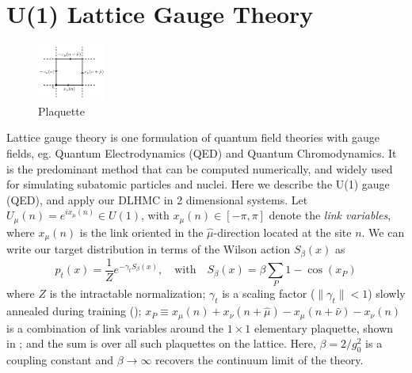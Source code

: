 \documentclass{article} %
\begin{document}
\section{\label{sec:lattice_gauge_theory}U(1) Lattice Gauge Theory}
%
\begin{figure}
      \centering
      \includegraphics[width=0.2\textwidth]{figures/plaq_tikz.pdf}
      \caption{\label{fig:plaquette}Plaquette}%
\end{figure}
Lattice gauge theory is one formulation of quantum field theories with gauge fields, eg. Quantum Electrodynamics (QED) and Quantum Chromodynamics.
It is the predominant method that can be computed numerically, and widely used for simulating subatomic particles and nuclei.
Here we describe the U(1) gauge (QED), and apply our DLHMC in 2 dimensional systems.
Let \(U_{\mu}(n) = e^{i x_{\mu}(n)} \in U(1)\), with \(x_{\mu}(n) \in [-\pi,\pi]\) denote the \emph{link
variables}, where \(x_{\mu}(n)\) is the link oriented in the \(\hat{\mu}\)-direction located at the site
\(n\).
%
We can write our target distribution in terms of the Wilson action \(S_{\beta}(x)\) as
%
\begin{equation}
   p_{t}(x) = \frac{1}{Z}e^{-\gamma_{t} S_{\beta}(x)},\quad\text{with}\quad S_{\beta}(x) = \beta \sum_{P}1 - \cos(x_{P})
   \label{eq:wilsonaction}
\end{equation}
%
where $Z$ is the intractable normalization;
\(\gamma_{t}\) is a scaling factor (\(\|\gamma_{t}\|<1\)) slowly annealed during training ();
\(x_{P} \equiv x_{\mu}(n) + x_{\nu}(n+\hat{\mu}) - x_{\mu}(n+\hat{\nu}) -x_{\nu}(n)\) is a combination of link
variables around the \(1\times1\) elementary plaquette, shown in ; and the sum is over all
such plaquettes on the lattice.
%
Here, \(\beta = 2 / g_{0}^{2}\) is a coupling constant and \(\beta\rightarrow\infty\) recovers the continuum limit of the theory. 
%
\end{document}
